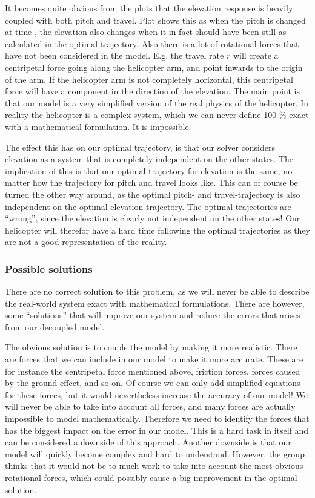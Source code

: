 \documentclass[../main.tex]{subfiles}
\begin{document}
It becomes quite obvious from the plots  that the elevation response is heavily coupled with both pitch and travel. Plot  shows this as when the pitch is changed at time , the elevation also changes when it in fact should have been still as calculated in the optimal trajectory. Also there is a lot of rotational forces that have not been considered in the model. E.g. the travel rate $ r $ will create a centripetal force going along the helicopter arm, and point inwards to the origin of the arm. If the helicopter arm is not completely horizontal, this centripetal force will have a component in the direction of the elevation. The main point is that our model is a very simplified version of the real physics of the helicopter. In reality the helicopter is a complex system, which we can never define 100 \% exact with a mathematical formulation. It is impossible.

The effect this has on our optimal trajectory, is that our solver considers elevation as a system that is completely independent on the other states. The implication of this is that our optimal trajectory for elevation is the same, no matter how the trajectory for pitch and travel looks like.  This can of course be turned the other way around, as the optimal pitch- and travel-trajectory is also independent on the optimal elevation trajectory. The optimal trajectories are ``wrong'', since the elevation is clearly not independent on the other states! Our helicopter will therefor have a hard time following the optimal trajectories as they are not a good representation of the reality.

\subsubsection{Possible solutions}
There are no correct solution to this problem, as we will never be able to describe the real-world system exact with mathematical formulations. There are however, some ``solutions'' that will improve our system and reduce the errors that arises from our decoupled model.

The obvious solution is to couple the model by making it more realistic. There are forces that we can include in our model to make it more accurate. These are for instance the centripetal force mentioned above, friction forces, forces caused by the ground effect, and so on. Of course we can only add simplified equations for these forces, but it would nevertheless increase the accuracy of our model! We will never be able to take into account all forces, and many forces are actually impossible to model mathematically. Therefore we need to identify the forces that has the biggest impact on the error in our model. This is a hard task in itself and can be considered a downside of this approach. Another downside is that our model will quickly become complex and hard to understand. However, the group thinks that it would not be to much work to take into account the most obvious rotational forces, which could possibly cause a big improvement in the optimal solution.
\end{document}
